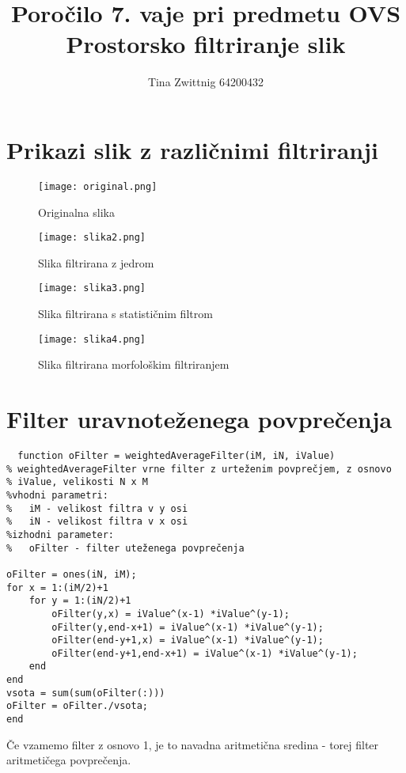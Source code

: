 \documentclass[12pt,a4paper]{article}
\author{Tina Zwittnig 64200432}
\title{Poročilo 7. vaje pri predmetu OVS \\ Prostorsko filtriranje slik}
\begin{document}
\maketitle
\pagebreak
\section{Prikazi slik z različnimi filtriranji}
\begin{figure}[h!]
  \begin{center}
    \texttt{[image: original.png]}
    \caption{Originalna slika}
    \label{fig:}
  \end{center}
\end{figure}
\begin{figure}[h!]
  \begin{center}
    \texttt{[image: slika2.png]}
    \caption{Slika filtrirana z jedrom}
    \label{fig:}
  \end{center}
\end{figure}
\begin{figure}[h!]
  \begin{center}
    \texttt{[image: slika3.png]}
    \caption{Slika filtrirana s statističnim filtrom}
    \label{fig:}
  \end{center}
\end{figure}
\begin{figure}[h!]
  \begin{center}
    \texttt{[image: slika4.png]}
    \caption{Slika filtrirana morfološkim filtriranjem}
    \label{fig:}
  \end{center}
\end{figure}
\pagebreak
\section{Filter uravnoteženega povprečenja}
\begin{verbatim}
  function oFilter = weightedAverageFilter(iM, iN, iValue)
% weightedAverageFilter vrne filter z urteženim povprečjem, z osnovo
% iValue, velikosti N x M
%vhodni parametri:
%   iM - velikost filtra v y osi
%   iN - velikost filtra v x osi
%izhodni parameter:
%   oFilter - filter uteženega povprečenja

oFilter = ones(iN, iM);
for x = 1:(iM/2)+1
    for y = 1:(iN/2)+1
        oFilter(y,x) = iValue^(x-1) *iValue^(y-1);
        oFilter(y,end-x+1) = iValue^(x-1) *iValue^(y-1);
        oFilter(end-y+1,x) = iValue^(x-1) *iValue^(y-1);
        oFilter(end-y+1,end-x+1) = iValue^(x-1) *iValue^(y-1);
    end
end
vsota = sum(sum(oFilter(:)))
oFilter = oFilter./vsota;
end

\end{verbatim}
Če vzamemo filter z osnovo 1, je to navadna aritmetična sredina - torej filter aritmetičega povprečenja.
\end{document}
